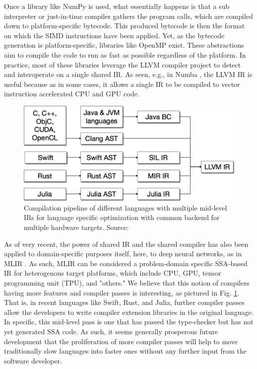 \documentclass{IEEEtran}
\begin{document}
Once a library like NumPy is used, what essentially happens is that a sub interpreter or just-in-time compiler gathers the program calls, which are compiled down to platform-specific bytecode. This produced bytecode is then the format on which the SIMD instructions have been applied. Yet, as the bytecode generation is platform-specific, libraries like OpenMP exist. These abstractions aim to compile the code to run as fast as possible regardless of the platform. In practice, most of these libraries leverage the \gls{LLVM} compiler project to detect and interoperate on a single shared \gls{IR}. As seen, e.g., in Numba \cite{lam2015numba}, the LLVM IR is useful because as in some cases, it allows a single IR to be compiled to vector instruction accelerated \gls{CPU} and \gls{GPU} code.

\begin{figure}
  \centering
  \includegraphics[width=\columnwidth]{./assets/mlir.png}
  \caption{Compilation pipeline of different languages with multiple mid-level IRs for language specific optimization with common backend for multiple hardware targets. Source: \cite{lattner2020mlir}}
  \label{fig:mlir}
\end{figure}

As of very recent, the power of shared IR and the shared compiler has also been applied to domain-specific purposes itself, here, to deep neural networks, as in MLIR \cite{lattner2020mlir}. As such, MLIR can be considered a problem-domain specific \gls{SSA}-based IR for heterogenous target platforms, which include CPU, GPU, tensor programming unit (TPU), and "others." We believe that this notion of compilers having more features and compiler passes is interesting, as pictured in Fig. \ref{fig:mlir}. That is, in recent languages like Swift, Rust, and Julia, further compiler passes allow the developers to write compiler extension libraries in the original language. In specific, this mid-level pass is one that has passed the type-checker but has not yet generated SSA code. As such, it seems generally prosperous future development that the proliferation of more compiler passes will help to move traditionally slow languages into faster ones without any further input from the software developer.
\end{document}
